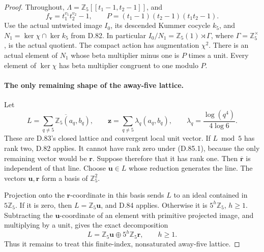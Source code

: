 \begin{proof}
Throughout, \(\Lambda=\mathbb Z_5[[t_1-1,t_2-1]]\), and
\[
 f_{\mathbf v}=t_1^{v_1}t_2^{v_2}-1,
 \qquad P=(t_1-1)(t_2-1)(t_1t_2-1).
\]
Use the actual untwisted image \(I_0\), its descended Kummer
cocycle \(k_5\), and \(N_1=\ker\chi\cap\ker k_5\) from
D.82. In particular \(I_0/N_1=\mathbb Z_5(1)\rtimes\Gamma\),
where \(\Gamma=\mathbb Z_5^\times\), is the actual quotient.
The compact action has augmentation \(\chi^2\).
There is an actual element of \(N_1\) whose beta multiplier
minus one is \(P\) times a unit. Every element of \(\ker\chi\)
has beta multiplier congruent to one modulo \(P\).

\paragraph{The only remaining shape of the away-five lattice.}
Let
\[
 L=\overline{\sum_{q\ne5}\mathbb Z_5(a_q,b_q)},
 \qquad
 \mathbf z=\sum_{q\ne5}\lambda_q(a_q,b_q),
 \qquad \lambda_q=\frac{\log(q^4)}{4\log6}.
                                                               \tag{D.85.6}
\]
These are D.83's closed lattice and convergent local unit
vector. If \(L\bmod5\) has rank two, D.82 applies. It
cannot have rank zero under (D.85.1), because the only
remaining vector would be \(\mathbf r\). Suppose therefore
that it has rank one. Then \(\overline{\mathbf r}\) is
independent of that line. Choose \(\mathbf u\in L\) whose
reduction generates the line. The vectors
\(\mathbf u,\mathbf r\) form a basis of \(\mathbb Z_5^2\).

Projection onto the \(\mathbf r\)-coordinate in this basis
sends \(L\) to an ideal contained in \(5\mathbb Z_5\).
If it is zero, then \(L=\mathbb Z_5\mathbf u\), and D.84
applies. Otherwise it is \(5^h\mathbb Z_5\), \(h\ge1\).
Subtracting the \(\mathbf u\)-coordinate of an element
with primitive projected image, and multiplying by a unit,
gives the exact decomposition
\[
 L=\mathbb Z_5\mathbf u\oplus5^h\mathbb Z_5\mathbf r,
 \qquad h\ge1.
                                                               \tag{D.85.7}
\]
Thus it remains to treat this finite-index, nonsaturated
away-five lattice.


\end{proof}
